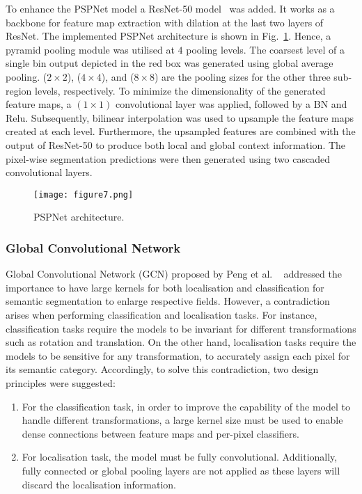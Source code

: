 To enhance the PSPNet model a ResNet-50 model~\cite{He2016} was added. 
It works as a backbone for feature map extraction with dilation at the last two layers of ResNet. 
The implemented PSPNet architecture is shown in Fig.~\ref{fig:PSPNet}.
Hence, a pyramid pooling module was utilised at \(4\) pooling levels.
The coarsest level of a single bin output depicted in the red box was generated using global average pooling.
(\(2\times2\)), (\(4\times 4\)), and (\(8\times8\)) are the pooling sizes for the other three sub-region levels, respectively.
To minimize the dimensionality of the generated feature maps, a \((1\times 1)\) convolutional layer was applied, followed by a BN and Relu.
Subsequently, bilinear interpolation was used to upsample the feature maps created at each level.
Furthermore, the upsampled features are combined with the output of ResNet-50 to produce both local and global context information.
The pixel-wise segmentation predictions were then generated using two cascaded convolutional layers. 
\begin{figure} [h!]
	\centering
	\texttt{[image: figure7.png]}
	\caption{PSPNet architecture.} 
	\label{fig:PSPNet}
\end{figure} 
\subsubsection{Global Convolutional Network}
Global Convolutional Network (GCN) proposed by Peng et al. 
~\cite{Peng2017} addressed the importance to have large kernels for both 
localisation and classification for semantic segmentation to enlarge 
respective fields.
However, a contradiction arises when performing classification and localisation 
tasks. 
For instance, classification tasks require the models to be invariant for 
different transformations such as rotation and translation.
On the other hand, localisation tasks require the models to be sensitive for 
any transformation, to accurately assign each pixel for its semantic category.
Accordingly, to solve this contradiction, two design principles were suggested: 
\begin{enumerate}
	\item For the classification task, in order to improve the capability of 
	the model to handle different transformations, a large kernel size must be 
	used to enable dense connections between feature maps and per-pixel 
	classifiers.
	\item For localisation task, the model must be fully convolutional. 
	Additionally, fully connected or global pooling layers are not applied as 
	these layers will discard the localisation information. 
\end{enumerate}

